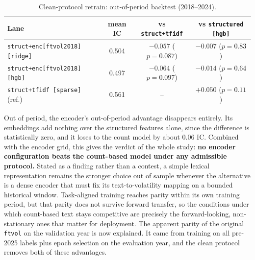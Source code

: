 \documentclass[logo,msc,ai]{infthesis}        %
\begin{document}
\begin{table}[h]
\centering
\footnotesize
\caption{Clean-protocol retrain: out-of-period backtest (2018--2024).}
\label{tab:clean}
\begin{tabular}{@{}L{5.6cm}ccc@{}}
\toprule
\textbf{Lane} & \textbf{mean IC} & \textbf{vs \texttt{struct+tfidf}} & \textbf{vs \texttt{structured [hgb]}} \\
\midrule
\texttt{struct+enc[ftvol2018] [ridge]} & 0.504 & $-0.057$ ($p=0.087$) & $-0.007$ ($p=0.83$) \\
\texttt{struct+enc[ftvol2018] [hgb]}   & 0.497 & $-0.064$ ($p=0.097$) & $-0.014$ ($p=0.64$) \\
\texttt{struct+tfidf [sparse]} (ref.)  & 0.561 & --                  & $+0.050$ ($p=0.11$) \\
\bottomrule
\end{tabular}
\end{table}

Out of period, the encoder's out-of-period advantage disappears entirely. Its embeddings add nothing over the structured features alone, since the difference is statistically zero, and it loses to the count model by about 0.06 IC. Combined with the encoder grid, this gives the verdict of the whole study: \textbf{no encoder configuration beats the count-based model under any admissible protocol.} Stated as a finding rather than a contest, a simple lexical representation remains the stronger choice out of sample whenever the alternative is a dense encoder that must fix its text-to-volatility mapping on a bounded historical window. Task-aligned training reaches parity within its own training period, but that parity does not survive forward transfer, so the conditions under which count-based text stays competitive are precisely the forward-looking, non-stationary ones that matter for deployment. The apparent parity of the original \texttt{ftvol} on the validation year is now explained. It came from training on all pre-2025 labels plus epoch selection on the evaluation year, and the clean protocol removes both of these advantages.
\end{document}
